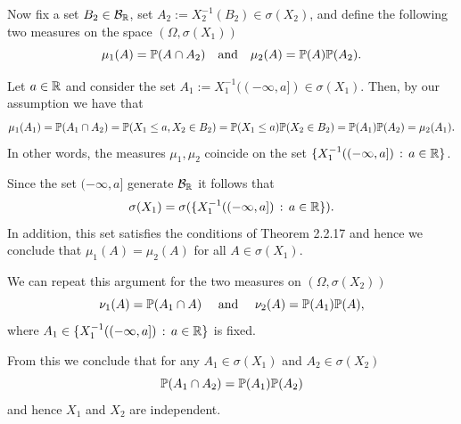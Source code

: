 Now fix a set $B_2 \in \mathcal B_{\mathbb R}$, set $A_2 := X_2^{-1}(B_2) \in \sigma(X_2)$, and define the following two measures on the space $(\Omega, \sigma(X_1))$
\[
	\mu_1(A) = \mathbb P(A \cap A_2) \quad \text{and} \quad \mu_2(A) = \mathbb P(A)\mathbb P(A_2).
\]  

Let $a \in \mathbb R$ and consider the set $A_1 := X_1^{-1}((-\infty ,a]) \in \sigma(X_1)$. Then, by our assumption we have that
\[
	\mu_1(A_1) = \mathbb P(A_1 \cap A_2) = \mathbb P(X_1 \le a, X_2 \in B_2) = \mathbb P(X_1 \le a) \mathbb P(X_2 \in B_2) = \mathbb P(A_1) \mathbb P(A_2)
	= \mu_2(A_1).
\]
In other words, the measures $\mu_1, \mu_2$ coincide on the set $\{X_1^{-1}((-\infty, a]) \, : \, a \in \mathbb R\}$.

Since the set $(-\infty,a]$ generate $\mathcal B_{\mathbb R}$ it follows that 
\[
	\sigma(X_1) = \sigma(\{X_1^{-1}((-\infty, a]) \, : \, a \in \mathbb R\}).
\]
In addition, this set satisfies the conditions of Theorem 2.2.17 and hence we conclude that $\mu_1(A) = \mu_2(A)$ for all $A \in \sigma(X_1)$.

We can repeat this argument for the two measures on $(\Omega, \sigma(X_2))$
\[
	\nu_1(A) = \mathbb P(A_1 \cap A) \quad \text{ and } \quad \nu_2(A) = \mathbb P(A_1) \mathbb P(A), 
\]
where $A_1 \in \{X_1^{-1}((-\infty, a]) \, : \, a \in \mathbb R\}$ is fixed. 

From this we conclude that for any $A_1 \in \sigma(X_1)$ and $A_2 \in \sigma(X_2)$
\[
	\mathbb P(A_1 \cap A_2) = \mathbb P(A_1)\mathbb P(A_2)
\]
and hence $X_1$ and $X_2$ are independent.

